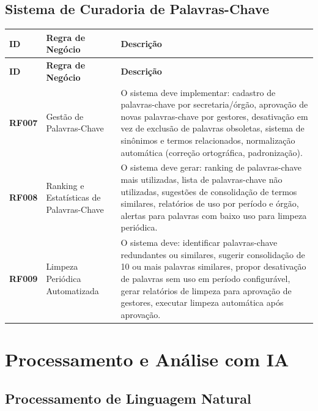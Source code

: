 \documentclass[12pt,a4paper]{article}
\newcommand{\rf}[1]{\textbf{\color{primaryblue}RF#1}}
\begin{document}
\subsection{Sistema de Curadoria de Palavras-Chave}

\begin{longtable}{|p{2cm}|p{5cm}|p{8cm}|}
\hline
\textbf{ID} & \textbf{Regra de Negócio} & \textbf{Descrição} \\
\hline
\endfirsthead
\hline
\textbf{ID} & \textbf{Regra de Negócio} & \textbf{Descrição} \\
\hline
\endhead

\rf{007} & Gestão de Palavras-Chave & O sistema deve implementar: cadastro de palavras-chave por secretaria/órgão, aprovação de novas palavras-chave por gestores, desativação em vez de exclusão de palavras obsoletas, sistema de sinônimos e termos relacionados, normalização automática (correção ortográfica, padronização). \\
\hline

\rf{008} & Ranking e Estatísticas de Palavras-Chave & O sistema deve gerar: ranking de palavras-chave mais utilizadas, lista de palavras-chave não utilizadas, sugestões de consolidação de termos similares, relatórios de uso por período e órgão, alertas para palavras com baixo uso para limpeza periódica. \\
\hline

\rf{009} & Limpeza Periódica Automatizada & O sistema deve: identificar palavras-chave redundantes ou similares, sugerir consolidação de 10 ou mais palavras similares, propor desativação de palavras sem uso em período configurável, gerar relatórios de limpeza para aprovação de gestores, executar limpeza automática após aprovação. \\
\hline

\end{longtable}

\section{Processamento e Análise com IA}

\subsection{Processamento de Linguagem Natural}
\end{document}

